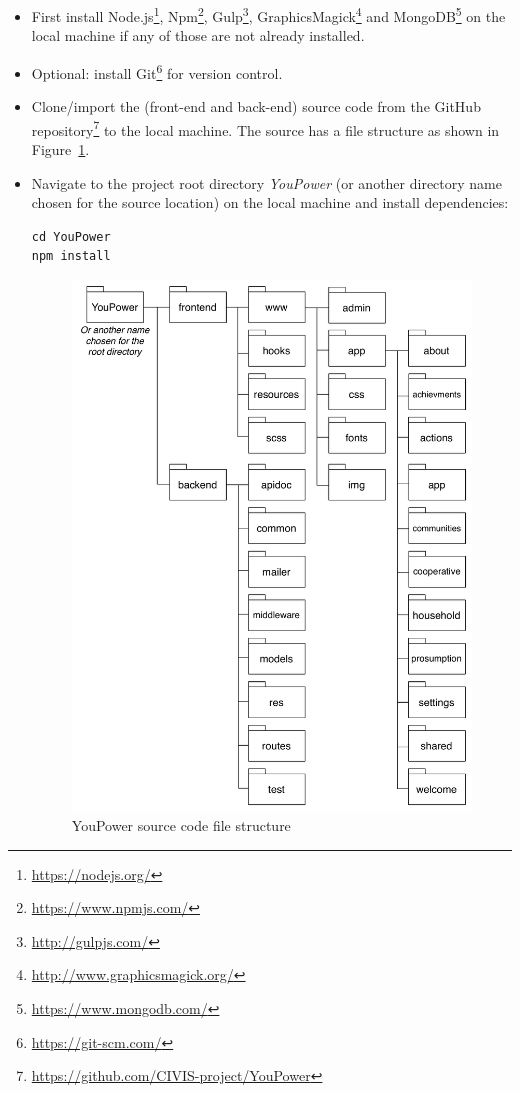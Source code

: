 \begin{itemize}

\item First install Node.js\footnote{\url{https://nodejs.org/}}, Npm\footnote{\url{https://www.npmjs.com/}},
Gulp\footnote{\url{http://gulpjs.com/}},  GraphicsMagick\footnote{\url{http://www.graphicsmagick.org/}} and MongoDB\footnote{\url{https://www.mongodb.com/}} on the local machine if any of those are not already installed. 

\item Optional: install Git\footnote{\url{https://git-scm.com/}} for version control.

\item Clone/import the (front-end and back-end) source code from the GitHub repository\footnote{\url{https://github.com/CIVIS-project/YouPower}} to the local machine. The source has a file structure as shown in Figure~\ref{fig:files}. 

\item Navigate to the project root directory \textit{YouPower} (or another directory name chosen for the source location) on the local machine and install dependencies: 
\begin{lstlisting}
cd YouPower
npm install
\end{lstlisting}

\begin{figure}
\centering
\includegraphics[width=0.9\linewidth]{img/files}
\caption{YouPower source code file structure}
\label{fig:files}
\end{figure}


\end{itemize}
